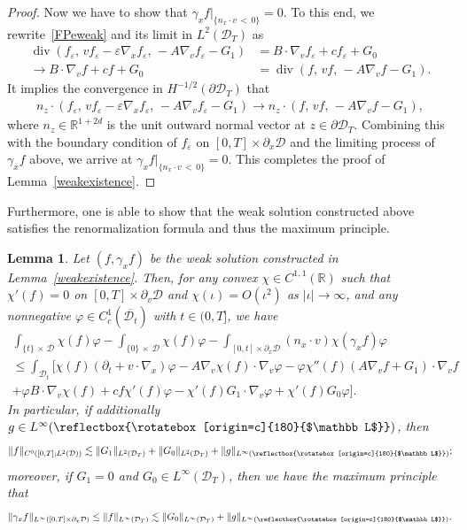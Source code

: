 \documentclass[10pt]{amsart}
\newtheorem{lemm}[theo]{Lemma}\newtheorem{prop}[theo]{Proposition}\newtheorem{coro}[theo]{Corollary}\newtheorem{conj}[theo]{Conjecture}
\theoremstyle{definition}\newtheorem{defi}[theo]{Definition}\newtheorem{rema}[theo]{Remark}\newtheorem{exam}[theo]{Example}\newtheorem{exem}[theo]{Example}\newtheorem{nota}[theo]{Notation}
\renewcommand*\div{\operatorname{div}}
\newcommand*\p{\partial}
\newcommand*\R {\mathbb{R}}
\newcommand*\D {\mathcal{D}}
\newcommand\GG{\reflectbox{\rotatebox[origin=c]{180}{$\mathbb L$}}}
\begin{document}
\begin{proof}
Now we have to show that $\gamma_xf|_{\{n_x\cdot v\,<\,0\}}=0$. To this end, we rewrite~\eqref{FPeweak} and its limit in $L^2(\D_T)$ as
\begin{align*}
\div\left(f_\varepsilon,\, vf_\varepsilon-\varepsilon\nabla_xf_\varepsilon,\, -A\nabla_v f_\varepsilon -G_1\right) &= B\cdot\nabla_vf_\varepsilon +cf_\varepsilon+G_0\\
\rightarrow B\cdot\nabla_vf +cf+G_0 &=\div\left(f,\, vf,\, -A\nabla_v f -G_1\right) .
\end{align*}
It implies the convergence in $H^{-1/2}(\p\D_T)$ that
\begin{align*}
n_z\cdot\left(f_\varepsilon,\,vf_\varepsilon - \varepsilon\nabla_xf_\varepsilon,\,-A\nabla_v f_\varepsilon -G_1\right)
\rightarrow n_z\cdot\left(f,\,vf,\,-A\nabla_v f -G_1\right),
\end{align*}
where $n_z\in\R^{1+2d}$ is the unit outward normal vector at $z\in\p\D_T$. Combining this with the boundary condition of $f_\varepsilon$ on $[0,T]\times\p_x\D$ and the limiting process of $\gamma_xf$ above, we arrive at $\gamma_xf|_{\{n_x\cdot v\,<\,0\}}=0$. This completes the proof of Lemma~\ref{weakexistence}.
\end{proof}

Furthermore, one is able to show that the weak solution constructed above satisfies the renormalization formula and thus the maximum principle.

\begin{lemm}\label{max}
Let $(f,\gamma_xf)$ be the weak solution constructed in Lemma~\ref{weakexistence}. Then, for any convex $\chi\in C^{1,1}(\R)$ such that $\chi'(f)=0$ on $[0,T]\times\p_v\D$ and $\chi(\iota)=O(\iota^2)$ as $|\iota|\rightarrow\infty$, and any nonnegative $\varphi\in C^1_c(\overline{\D_t})$ with $t\in(0,T]$, we have
\begin{multline}\label{rene}
\int_{\{t\}\,\times\,\D}\chi(f)\varphi-\int_{\{0\}\,\times\,\D}\chi(f)\varphi -\int_{[0,t]\times\p_x\D}(n_x\cdot v)\chi(\gamma_xf)\varphi\\
\le \int_{\D_t} \big[\chi(f)(\p_t+v\cdot\nabla_x)\varphi -A\nabla_v\chi(f) \cdot\nabla_v\varphi - \varphi\chi''(f)(A\nabla_vf+G_1)\cdot\nabla_vf\\
+ \varphi B\cdot\nabla_v\chi(f) + c f\chi'(f)\varphi -\chi'(f) G_1\cdot\nabla_v\varphi + \chi'(f)G_0\varphi\big].
\end{multline}
In particular, if additionally $g\in L^\infty(\GG)$, then
\begin{equation}\label{maxl2}
\|f\|_{C^0\left([0,T];L^2(\D)\right)}\lesssim \|G_1\|_{L^2(\D_T)} +\|G_0\|_{L^2(\D_T)} +\|g\|_{L^\infty\left(\small\GG\right)};
\end{equation}
moreover, if $G_1=0$ and $G_0\in L^\infty(\D_T)$, then we have the maximum principle that
\begin{equation}\label{maxgg}
\|\gamma_xf\|_{L^\infty\left([0,T]\times\p_x\D\right)}
\le \|f\|_{L^\infty(\D_T)}
\lesssim \|G_0\|_{L^\infty(\D_T)} +\|g\|_{L^\infty\left(\small\GG\right)}.
\end{equation}
\end{lemm}
\end{document}
